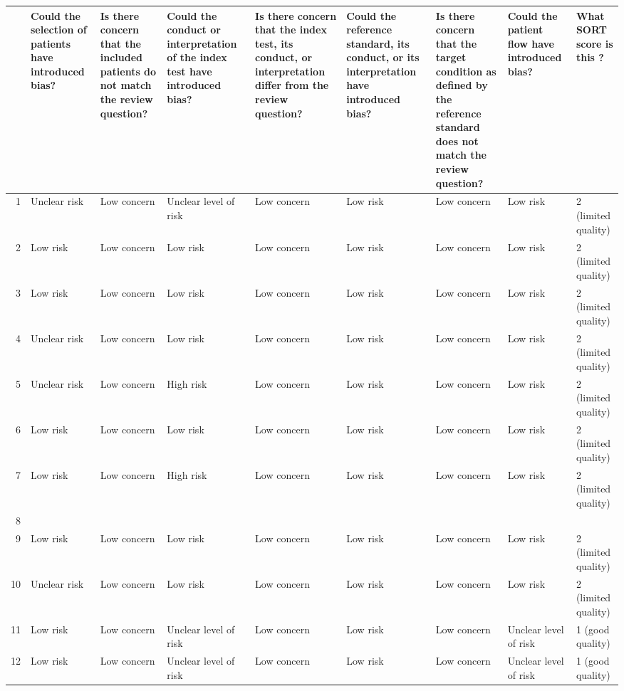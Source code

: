 \begin{table}[ht]
\centering
\begin{tabular}{rllllllll}
  \hline
 & Could the selection of patients have introduced bias? & Is there concern that the included patients do not match the review question? & Could the conduct or interpretation of the index test have introduced bias? & Is there concern that the index test, its conduct, or interpretation differ from the review question? & Could the reference standard, its conduct, or its interpretation have introduced bias? & Is there concern that the target condition as defined by the reference standard does not match the review question? & Could the patient flow have introduced bias? & What SORT score is this ? \\ 
  \hline
1 & Unclear risk & Low concern & Unclear level of risk & Low concern & Low risk & Low concern & Low risk & 2 (limited quality) \\ 
  2 & Low risk & Low concern & Low risk & Low concern & Low risk & Low concern & Low risk & 2 (limited quality) \\ 
  3 & Low risk & Low concern & Low risk & Low concern & Low risk & Low concern & Low risk & 2 (limited quality) \\ 
  4 & Unclear risk & Low concern & Low risk & Low concern & Low risk & Low concern & Low risk & 2 (limited quality) \\ 
  5 & Unclear risk & Low concern & High risk & Low concern & Low risk & Low concern & Low risk & 2 (limited quality) \\ 
  6 & Low risk & Low concern & Low risk & Low concern & Low risk & Low concern & Low risk & 2 (limited quality) \\ 
  7 & Low risk & Low concern & High risk & Low concern & Low risk & Low concern & Low risk & 2 (limited quality) \\ 
  8 &  &  &  &  &  &  &  &  \\ 
  9 & Low risk & Low concern & Low risk & Low concern & Low risk & Low concern & Low risk & 2 (limited quality) \\ 
  10 & Unclear risk & Low concern & Low risk & Low concern & Low risk & Low concern & Low risk & 2 (limited quality) \\ 
  11 & Low risk & Low concern & Unclear level of risk & Low concern & Low risk & Low concern & Unclear level of risk & 1 (good quality) \\ 
  12 & Low risk & Low concern & Unclear level of risk & Low concern & Low risk & Low concern & Unclear level of risk & 1 (good quality) \\ 

\end{tabular}
\end{table}
